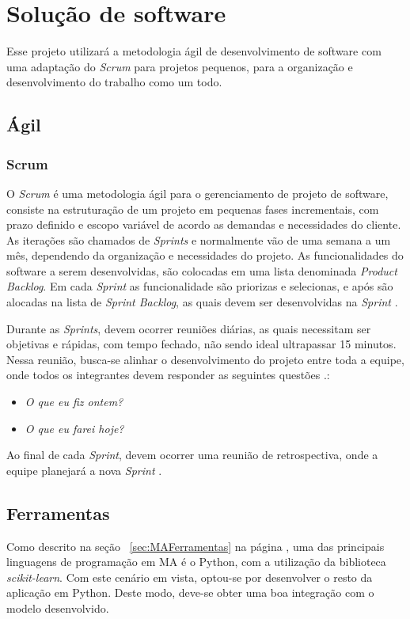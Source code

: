 \chapter[Solução de software]{Solução de software}
Esse projeto utilizará a metodologia ágil de desenvolvimento de software com uma adaptação do \textit{Scrum} para projetos pequenos, para a organização e desenvolvimento do trabalho como um todo.

\section{Ágil}
\subsection{Scrum}
O \textit{Scrum} é uma metodologia ágil para o gerenciamento de projeto de software, consiste na estruturação de um projeto em pequenas fases incrementais, com prazo definido e escopo variável de acordo as demandas e necessidades do cliente. As iterações são chamados de \textit{Sprints} e normalmente vão de uma semana a um mês, dependendo da organização e necessidades do projeto. As funcionalidades do software a serem desenvolvidas, são colocadas em uma lista denominada \textit{Product Backlog}. Em cada \textit{Sprint} as funcionalidade são priorizas e selecionas, e após são alocadas na lista de \textit{Sprint Backlog}, as quais devem ser desenvolvidas na \textit{Sprint} \cite{sutherland2016scrum}.

Durante as \textit{Sprints}, devem ocorrer reuniões diárias, as quais necessitam ser objetivas e rápidas, com tempo fechado, não sendo ideal ultrapassar 15 minutos. Nessa reunião, busca-se alinhar o desenvolvimento do projeto entre toda a equipe, onde todos os integrantes devem responder as seguintes questões \cite{sutherland2016scrum}.:
\begin{itemize}
    \item \textit{O que eu fiz ontem?}
    \item \textit{O que eu farei hoje?}
\end{itemize}

Ao final de cada \textit{Sprint}, devem ocorrer uma reunião de retrospectiva, onde a equipe planejará a nova \textit{Sprint} \cite{sutherland2016scrum}.

\section{Ferramentas}
Como descrito na seção ~\ref{sec:MAFerramentas} na página \pageref{sec:MAFerramentas}, uma das principais linguagens de programação em MA é o Python, com a utilização da biblioteca \textit{scikit-learn}. Com este cenário em vista, optou-se por desenvolver o resto da aplicação em Python. Deste modo, deve-se obter uma boa integração com o modelo desenvolvido.

